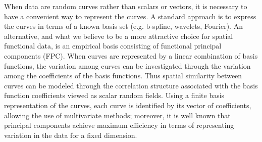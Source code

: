
When data are random curves rather than scalars or vectors, it is necessary to have a convenient way to represent the curves.  A standard approach is to express the curves in terms of a known basis set (e.g. b-spline, wavelets, Fourier). An alternative, and what we believe to be a more attractive choice for spatial functional data, is an empirical basis consisting of functional principal components (FPC). When curves are represented by a linear combination of basis functions, the variation among curves can be investigated through the variation among the coefficients of the basis functions. Thus spatial similarity between curves can be modeled through the correlation structure associated with the basis function coefficients viewed as scalar random fields. Using a finite basis representation of the curves, each curve is identified by its vector of coefficients, allowing the use of multivariate methods; moreover, it is well known that principal components achieve maximum efficiency in terms of representing variation in the data for a fixed dimension. 

%
%


